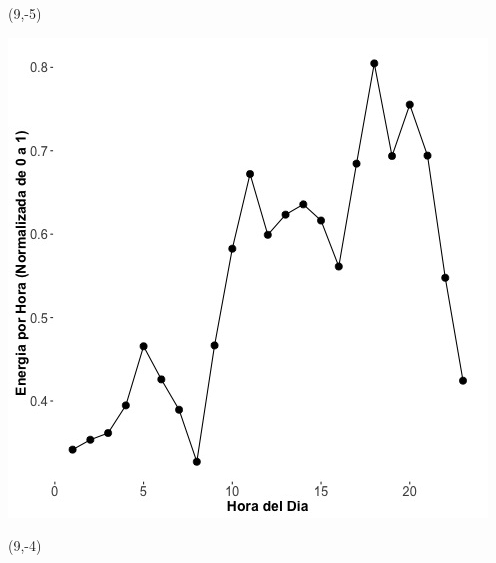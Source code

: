 \documentclass{article}\usepackage[]{graphicx}\usepackage[]{color}
\newenvironment{knitrout}{}{} %
\begin{document}
 \begin{textblock}{1}(9,-5)
\begin{minipage}{20em}
\begingroup

\endgroup
\end{minipage}
\end{textblock}

\begin{knitrout}
\color{fgcolor}
\includegraphics[scale=0.65]{figure/A24_plot_norm_median} 
\end{knitrout}


 \begin{textblock}{1}(9,-4)
\begin{minipage}{20em}
\begingroup

\endgroup
\end{minipage}
\end{textblock}
\end{document}
